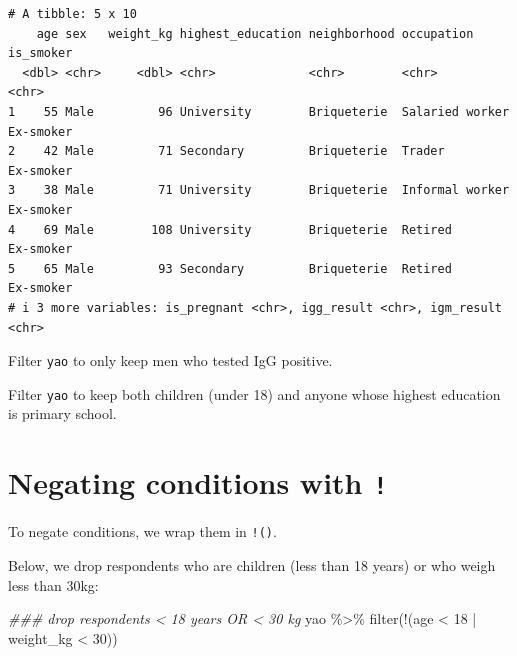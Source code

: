 \documentclass[
  letterpaper,
  DIV=11,
  numbers=noendperiod]{scrreprt}
\newenvironment{Shaded}{\begin{snugshade}}{\end{snugshade}}
\newcommand{\DecValTok}[1]{\textcolor[rgb]{0.68,0.00,0.00}{#1}}
\newcommand{\DocumentationTok}[1]{\textcolor[rgb]{0.37,0.37,0.37}{\textit{#1}}}
\newcommand{\FunctionTok}[1]{\textcolor[rgb]{0.28,0.35,0.67}{#1}}
\newcommand{\NormalTok}[1]{\textcolor[rgb]{0.00,0.23,0.31}{#1}}
\newcommand{\SpecialCharTok}[1]{\textcolor[rgb]{0.37,0.37,0.37}{#1}}
\begin{document}
\begin{verbatim}
# A tibble: 5 x 10
    age sex   weight_kg highest_education neighborhood occupation      is_smoker
  <dbl> <chr>     <dbl> <chr>             <chr>        <chr>           <chr>    
1    55 Male         96 University        Briqueterie  Salaried worker Ex-smoker
2    42 Male         71 Secondary         Briqueterie  Trader          Ex-smoker
3    38 Male         71 University        Briqueterie  Informal worker Ex-smoker
4    69 Male        108 University        Briqueterie  Retired         Ex-smoker
5    65 Male         93 Secondary         Briqueterie  Retired         Ex-smoker
# i 3 more variables: is_pregnant <chr>, igg_result <chr>, igm_result <chr>
\end{verbatim}

\begin{tcolorbox}[enhanced jigsaw, titlerule=0mm, colback=white, left=2mm, breakable, opacitybacktitle=0.6, colbacktitle=quarto-callout-tip-color!10!white, colframe=quarto-callout-tip-color-frame, bottomtitle=1mm, opacityback=0, coltitle=black, arc=.35mm, toptitle=1mm, title=\textcolor{quarto-callout-tip-color}{\faLightbulb}\hspace{0.5em}{Practice}, leftrule=.75mm, toprule=.15mm, bottomrule=.15mm, rightrule=.15mm]

Filter \texttt{yao} to only keep men who tested IgG positive.

Filter \texttt{yao} to keep both children (under 18) and anyone whose
highest education is primary school.

\end{tcolorbox}

\section{\texorpdfstring{Negating conditions with
\texttt{!}}{Negating conditions with !}}\label{negating-conditions-with}

To negate conditions, we wrap them in \texttt{!()}.

Below, we drop respondents who are children (less than 18 years) or who
weigh less than 30kg:

\begin{Shaded}
\begin{Highlighting}[]
\DocumentationTok{\#\#\# drop respondents \textless{} 18 years OR \textless{} 30 kg}
\NormalTok{yao }\SpecialCharTok{\%\textgreater{}\%} \FunctionTok{filter}\NormalTok{(}\SpecialCharTok{!}\NormalTok{(age }\SpecialCharTok{\textless{}} \DecValTok{18} \SpecialCharTok{|}\NormalTok{ weight\_kg }\SpecialCharTok{\textless{}} \DecValTok{30}\NormalTok{))}
\end{Highlighting}
\end{Shaded}
\end{document}
